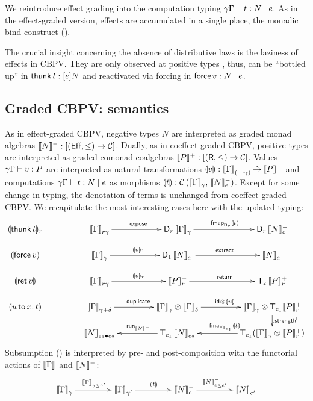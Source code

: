 \documentclass[acmsmall,review,anonymous]{acmart}\settopmatter{printfolios=true,printccs=false,printacmref=false}
\theoremstyle{remark}
\begin{document}
We reintroduce effect grading into the computation typing
$\qeCompTy \gamma \Gamma t e N$.  As in the effect-graded version,
effects are accumulated in a single place, the monadic bind construct
(\relim\diamond).

The crucial insight concerning the absence of distributive laws is the
laziness of effects in CBPV.  They are only observed at positive
types \citep{levy:hosc06},
thus, can be ``bottled up'' in $\thunk t : \thunkty e N$ and
reactivated via forcing in $\force v : N \mid e$.


\subsection{Graded CBPV: semantics}

As in effect-graded CBPV, negative types $N$ are interpreted as graded
monad algebras $\denn N : [(\Eff,\leq) \to \CC]$. Dually, as in
coeffect-graded CBPV, positive types are interpreted as graded comonad
coalgebras $\denp P : [(\R,\leq) \to \CC]$.  Values
$\qValTy \gamma \Gamma v P$ are interpreted as natural transformations
$\dent v : \Denpar \Gamma {\_\cdot\gamma} \todot \denp P$ and
computations $\qeCompTy \gamma \Gamma t e N$ as morphisms
$\dent t : \Hom {\Den\Gamma \gamma} {\Denn N e}$.  Except for some
change in typing, the denotation of terms is unchanged from
coeffect-graded CBPV.  We recapitulate the most interesting cases here
with the updated typing:
\[
\xymatrix@C=10ex@R=3ex{
\denv {\thunk t} r
& \Den \Gamma {r\gamma}     \ar[r]^{\expose}
& \D[r]\,\Den\Gamma\gamma   \ar[r]^{\fmapt[{\D[r]}]{\dent t}}
& \D[r]\,\Denn N e
\\
\dent {\force v}
& \Den \Gamma \gamma    \ar[r]^{\denv v 1}
& \D[1]\,\Denn N e      \ar[r]^{\extract}
& \Denn N e
\\
\dent {\ret v}
& \Den \Gamma {r\gamma}  \ar[r]^{\denv v r}
& \Denp P r              \ar[r]^{\treturn}
& \T[\Ge]\,\Denp P r
\\
\dent {\bind x u t}
& \Den \Gamma {\gamma + \delta}                 \ar[r]^{\duplicate}
& \Den \Gamma \gamma \otimes \Den \Gamma \delta \ar[r]^{\tid \otimes \dent u}
& \Den \Gamma \gamma \otimes \T[e_1] \Denp P r  \ar[d]^{\strengthl}
\\
& \Denn N {e_1 \bu e_2}
& \T[e_1]\,\Denn N {e_2}                        \ar[l]_{\run[\denn N]}
& \T[e_1](\Den \Gamma \gamma \otimes \Denp P r) \ar[l]_{\fmapt[{\T[e_1]}] {\dent t}}
}
\]
Subsumption (\rsub) is interpreted by pre- and post-composition with
the functorial actions of $\den \Gamma$ and $\denn N$:
\[
\xymatrix@C=10ex{
\Den \Gamma {\gamma}   \ar[r]^{\Den\Gamma{\gamma \leq \gamma'}}
& \Den \Gamma {\gamma'}  \ar[r]^{\dent t}
& \Denn N e              \ar[r]^{\Denn N {e \leq e'}}
& \Denn N {e'}
}
\]
\end{document}
